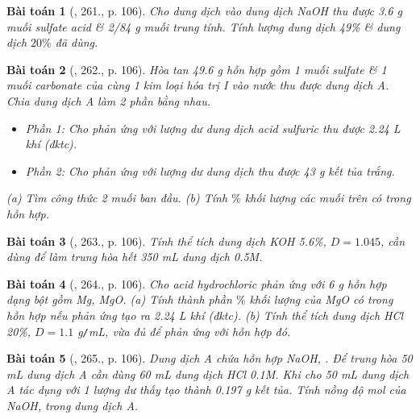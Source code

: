 \documentclass{article}
\newtheorem{baitoan}{Bài toán}
\begin{document}
\begin{baitoan}[\cite{Nguyen_Buu_Can_500_BT_Hoa_Hoc_THCS}, 261., p. 106]
	Cho dung dịch {\rm{}} vào dung dịch {\rm NaOH} thu được {\rm3.6 g} muối sulfate acid \& {\rm2/84 g} muối trung tính. Tính lượng dung dịch {\rm{} 49\%} \& dung dịch $20\%$ đã dùng.
\end{baitoan}

\begin{baitoan}[\cite{Nguyen_Buu_Can_500_BT_Hoa_Hoc_THCS}, 262., p. 106]
	Hòa tan {\rm49.6 g} hỗn hợp gồm 1 muối sulfate \& 1 muối carbonate của cùng 1 kim loại hóa trị {\rm I} vào nước thu được dung dịch A. Chia dung dịch A làm 2 phần bằng nhau.
	\begin{itemize}
		\item Phần 1: Cho phản ứng với lượng dư dung dịch acid sulfuric thu được {\rm2.24 L} khí (đktc).
		\item Phần 2: Cho phản ứng với lượng dư dung dịch {\rm{}} thu được {\rm43 g} kết tủa trắng.
	\end{itemize}
	(a) Tìm công thức 2 muối ban đầu. (b) Tính $\%$ khối lượng các muối trên có trong hỗn hợp.
\end{baitoan}

\begin{baitoan}[\cite{Nguyen_Buu_Can_500_BT_Hoa_Hoc_THCS}, 263., p. 106]
	Tính thể tích dung dịch {\rm KOH 5.6\%}, $D = 1.045$, cần dùng để làm trung hòa hết {\rm350 mL} dung dịch {\rm{} 0.5M}.
\end{baitoan}

\begin{baitoan}[\cite{Nguyen_Buu_Can_500_BT_Hoa_Hoc_THCS}, 264., p. 106]
	Cho acid hydrochloric phản ứng với {\rm6 g} hỗn hợp dạng bột gồm {\rm Mg, MgO}. (a) Tính thành phần $\%$ khối lượng của {\rm MgO} có trong hỗn hợp nếu phản ứng tạo ra {\rm2.24 L} khí {\rm{}} (đktc). (b) Tính thể tích dung dịch {\rm HCl 20\%}, $D = 1.1$ {\rm g{\tt/}mL}, vừa đủ để phản ứng với hỗn hợp đó.
\end{baitoan}

\begin{baitoan}[\cite{Nguyen_Buu_Can_500_BT_Hoa_Hoc_THCS}, 265., p. 106]
	Dung dịch A chứa hỗn hợp {\rm NaOH, }. Để trung hòa {\rm50 mL} dung dịch A cần dùng {\rm60 mL} dung dịch {\rm HCl 0.1M}. Khi cho {\rm50 mL} dung dịch A tác dụng với 1 lượng dư {\rm{}} thấy tạo thành {\rm0.197 g} kết tủa. Tính nồng độ mol của {\rm NaOH, } trong dung dịch A.
\end{baitoan}
\end{document}

